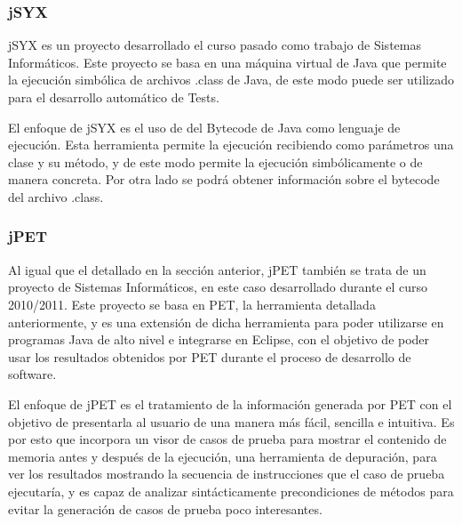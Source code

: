 \subsubsection{jSYX}
\label{ap25:sec:jsyx}

jSYX es un proyecto desarrollado el curso pasado como trabajo de Sistemas Inform\'aticos. Este proyecto se basa en una m\'aquina virtual de Java que permite la ejecuci\'on simb\'olica de archivos .class de Java, de este modo puede ser utilizado para el desarrollo autom\'atico de Tests. 

El enfoque de jSYX es el uso de del Bytecode de Java como lenguaje de ejecuci\'on. Esta herramienta permite la ejecuci\'on recibiendo como par\'ametros una clase y su m\'etodo, y de este modo permite la ejecuci\'on simb\'olicamente o de manera concreta. Por otra lado se podr\'a obtener informaci\'on sobre el bytecode del archivo .class.

\subsubsection{jPET}
\label{ap25:sec:jpet}

Al igual que el detallado en la secci\'on anterior, jPET tambi\'en se trata de un proyecto de Sistemas Inform\'aticos, en este caso desarrollado durante el curso 2010/2011. Este proyecto se basa en PET, la herramienta detallada anteriormente, y es una extensi\'on de dicha herramienta para poder utilizarse en programas Java de alto nivel e integrarse en Eclipse, con el objetivo de poder usar los resultados obtenidos por PET durante el proceso de desarrollo de software.

El enfoque de jPET es el tratamiento de la informaci\'on generada por PET con el objetivo de presentarla al usuario de una manera m\'as f\'acil, sencilla e intuitiva. Es por esto que incorpora un visor de casos de prueba para mostrar el contenido de memoria antes y despu\'es de la ejecuci\'on, una herramienta de depuraci\'on, para ver los resultados mostrando la secuencia de instrucciones que el caso de prueba ejecutar\'ia, y es capaz de analizar sint\'acticamente precondiciones de m\'etodos para evitar la generaci\'on de casos de prueba poco interesantes.



